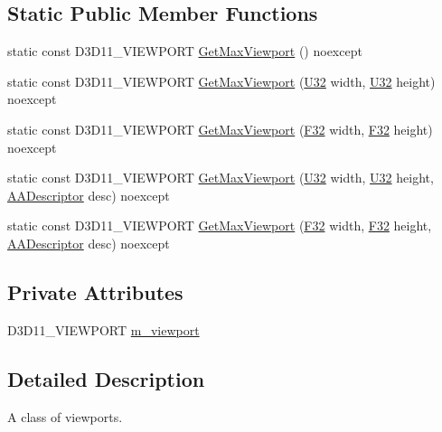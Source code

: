 \subsection*{Static Public Member Functions}
\begin{DoxyCompactItemize}
\item 
static const D3\+D11\+\_\+\+V\+I\+E\+W\+P\+O\+RT \hyperlink{classmage_1_1_viewport_aec4a434cbb6f68805d02f1be6ecbf5a8}{Get\+Max\+Viewport} () noexcept
\item 
static const D3\+D11\+\_\+\+V\+I\+E\+W\+P\+O\+RT \hyperlink{classmage_1_1_viewport_a6463b68fb105634e92fef03923860275}{Get\+Max\+Viewport} (\hyperlink{namespacemage_a41c104c036fba3756a74e19f793eeaa1}{U32} width, \hyperlink{namespacemage_a41c104c036fba3756a74e19f793eeaa1}{U32} height) noexcept
\item 
static const D3\+D11\+\_\+\+V\+I\+E\+W\+P\+O\+RT \hyperlink{classmage_1_1_viewport_afa370989bface41f89d1dc11b11ac0bd}{Get\+Max\+Viewport} (\hyperlink{namespacemage_aa97e833b45f06d60a0a9c4fc22ae02c0}{F32} width, \hyperlink{namespacemage_aa97e833b45f06d60a0a9c4fc22ae02c0}{F32} height) noexcept
\item 
static const D3\+D11\+\_\+\+V\+I\+E\+W\+P\+O\+RT \hyperlink{classmage_1_1_viewport_a04cd0dec1cbb66cfe0a8776870a175d7}{Get\+Max\+Viewport} (\hyperlink{namespacemage_a41c104c036fba3756a74e19f793eeaa1}{U32} width, \hyperlink{namespacemage_a41c104c036fba3756a74e19f793eeaa1}{U32} height, \hyperlink{namespacemage_a0b400065340fa5cca0ce4c2809d91af1}{A\+A\+Descriptor} desc) noexcept
\item 
static const D3\+D11\+\_\+\+V\+I\+E\+W\+P\+O\+RT \hyperlink{classmage_1_1_viewport_aa217e71e22be17179f6e1e9e18b30b77}{Get\+Max\+Viewport} (\hyperlink{namespacemage_aa97e833b45f06d60a0a9c4fc22ae02c0}{F32} width, \hyperlink{namespacemage_aa97e833b45f06d60a0a9c4fc22ae02c0}{F32} height, \hyperlink{namespacemage_a0b400065340fa5cca0ce4c2809d91af1}{A\+A\+Descriptor} desc) noexcept
\end{DoxyCompactItemize}
\subsection*{Private Attributes}
\begin{DoxyCompactItemize}
\item 
D3\+D11\+\_\+\+V\+I\+E\+W\+P\+O\+RT \hyperlink{classmage_1_1_viewport_a9509003aae2c6cd0f33cfc875cd235f4}{m\+\_\+viewport}
\end{DoxyCompactItemize}


\subsection{Detailed Description}
A class of viewports. 

